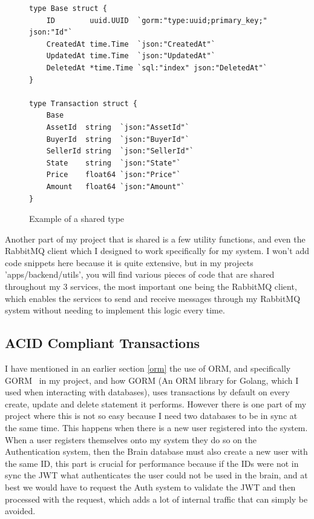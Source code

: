 \documentclass[titlepage]{article}
\begin{document}
\begin{figure}
  \begin{verbatim}
type Base struct {
	ID        uuid.UUID  `gorm:"type:uuid;primary_key;" json:"Id"`
	CreatedAt time.Time  `json:"CreatedAt"`
	UpdatedAt time.Time  `json:"UpdatedAt"`
	DeletedAt *time.Time `sql:"index" json:"DeletedAt"`
}

type Transaction struct {
	Base
	AssetId  string  `json:"AssetId"`
	BuyerId  string  `json:"BuyerId"`
	SellerId string  `json:"SellerId"`
	State    string  `json:"State"`
	Price    float64 `json:"Price"`
	Amount   float64 `json:"Amount"`
}
  \end{verbatim}
  \caption{Example of a shared type}
  \label{sharedtype}
\end{figure}

Another part of my project that is shared is a few utility functions, and even the RabbitMQ client which I designed to work specifically for my system. I won't add code snippets here because it is quite extensive, but in my projects 'apps/backend/utils', you will find various pieces of code that are shared throughout my 3 services, the most important one being the RabbitMQ client, which enables the services to send and receive messages through my RabbitMQ system without needing to implement this logic every time.

\subsection{ACID Compliant Transactions}
I have mentioned in an earlier section \ref{orm} the use of ORM, and specifically GORM~\cite{gorm} in my project, and how GORM (An ORM library for Golang, which I used when interacting with databases), uses transactions by default on every create, update and delete statement it performs. However there is one part of my project where this is not so easy because I need two databases to be in sync at the same time. This happens when there is a new user registered into the system. \\

When a user registers themselves onto my system they do so on the Authentication system, then the Brain database must also create a new user with the same ID, this part is crucial for performance because if the IDs were not in sync the JWT what authenticates the user could not be used in the brain, and at best we would have to request the Auth system to validate the JWT and then processed with the request, which adds a lot of internal traffic that can simply be avoided. \\
\end{document}
